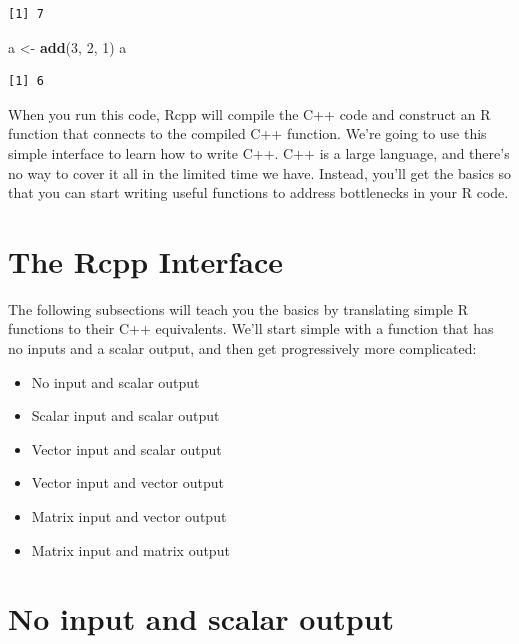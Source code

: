 \documentclass[]{krantz}
\makeatletter
\newenvironment{Shaded}{\begin{snugshade}}{\end{snugshade}}
\newcommand{\KeywordTok}[1]{\textcolor[rgb]{0.27,0.27,0.27}{\textbf{#1}}}
\newcommand{\DecValTok}[1]{\textcolor[rgb]{0.06,0.06,0.06}{#1}}
\newcommand{\StringTok}[1]{\textcolor[rgb]{0.5,0.5,0.5}{#1}}
\newcommand{\NormalTok}[1]{#1}
\providecommand{\tightlist}{%
  \setlength{\itemsep}{0pt}\setlength{\parskip}{0pt}}
\newenvironment{kframe}{%
\medskip{}
\setlength{\fboxsep}{.8em}
 \def\at@end@of@kframe{}%
 \ifinner\ifhmode%
  \def\at@end@of@kframe{\end{minipage}}%
  \begin{minipage}{\columnwidth}%
 \fi\fi%
 \def\FrameCommand##1{\hskip\@totalleftmargin \hskip-\fboxsep
 \colorbox{shadecolor}{##1}\hskip-\fboxsep
     \hskip-\linewidth \hskip-\@totalleftmargin \hskip\columnwidth}%
 \MakeFramed {\advance\hsize-\width
   \@totalleftmargin\z@ \linewidth\hsize
   \@setminipage}}%
 {\par\unskip\endMakeFramed%
 \at@end@of@kframe}
\renewenvironment{Shaded}{\begin{kframe}}{\end{kframe}}
\makeatother
\begin{document}
\begin{verbatim}
[1] 7
\end{verbatim}

\begin{Shaded}
\begin{Highlighting}[]
\NormalTok{a <-}\StringTok{ }\KeywordTok{add}\NormalTok{(}\DecValTok{3}\NormalTok{, }\DecValTok{2}\NormalTok{, }\DecValTok{1}\NormalTok{)}
\NormalTok{a}
\end{Highlighting}
\end{Shaded}

\begin{verbatim}
[1] 6
\end{verbatim}

When you run this code, Rcpp will compile the C++ code and construct an
R function that connects to the compiled C++ function. We're going to
use this simple interface to learn how to write C++. C++ is a large
language, and there's no way to cover it all in the limited time we
have. Instead, you'll get the basics so that you can start writing
useful functions to address bottlenecks in your R code.

\section{The Rcpp Interface}\label{the-rcpp-interface}

The following subsections will teach you the basics by translating
simple R functions to their C++ equivalents. We'll start simple with a
function that has no inputs and a scalar output, and then get
progressively more complicated:

\begin{itemize}
\tightlist
\item
  No input and scalar output
\item
  Scalar input and scalar output
\item
  Vector input and scalar output
\item
  Vector input and vector output
\item
  Matrix input and vector output
\item
  Matrix input and matrix output
\end{itemize}

\section{No input and scalar output}\label{no-input-and-scalar-output}
\end{document}
